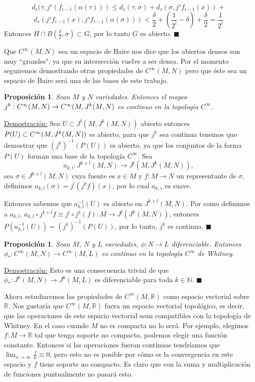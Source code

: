\documentclass{report}
\newtheorem{prop}[theorem]{Proposici\'on}
\theoremstyle{definition}
\begin{document}
$$ d_s (\tau , j^s (f_{i-1} (\alpha (\tau ))) \leq d_s( \tau , \sigma) + d_s (\sigma , j^s f_{i-1} (x)) +$$ $$ d_s (j^s f_{i-1} (x) , j^s f_{i-1} (\alpha (\sigma))) < \frac{\delta}{2} + \left( \frac{1}{2^{i}} - \delta \right) + \frac{\delta}{2} = \frac{1}{2^{i}}$$
Entonces  $H \cap B(\frac{\delta}{2} , \sigma ) \subset G$, por lo tanto $G$ es abierto. $\blacksquare$

Que $C^\infty (M,N)$ sea un espacio de Baire nos dice que los abiertos densos son muy ``grandes", ya que su intersecci\'on vuelve a ser densa. Por el momento seguiremos demostrando otras propiedades de $C^\infty (M,N)$ pero que \'este sea un espacio de Baire ser\'a una de las bases de este trabajo.

\begin{prop}
Sean $M$ y $N$ variedades. Entonces el mapeo $j^k : \\ C^\infty(M,N) \to C^\infty (M, J^k (M,N)$ es continuo en la topolog\'ia $C^\infty$.
\end{prop}
\underline{Demostraci\'on:} Sea $U \subset  J^l (M, J^k (M,N))$ abierto entonces $P(U) \subset \\ C^\infty (M , J^k (M, N))$ es abierto, para que $j^k$ sea continua tenemos que demostrar que $(j^k)^{-1} (P(U))$ es abierto, ya que los conjuntos de la forma $P(U)$ forman una base de la topolog\'ia $C^\infty$. Sea
$$a_{k,l}: J^{k+l} (M,N) \to J^l (M, J^k (M,N)),$$ sea $\sigma \in J^{k+l} (M,N)$ cuya fuente es $x\in M$ y $f:M \to N$ un representante de $\sigma$, definimos $a_{k,l} (\sigma) = j^l (j^k f) (x)$, por lo cual $a_{k,s}$ es suave.

Entonces sabemos que $a_{k,l}^{-1} (U)$ es abierto en $J^{k+l} (M,N)$. Por como definimos a $a_{k,l}$, $a_{k,l} \circ j^{k+l} f \equiv j^l \circ j^k (f) : M \to J^l (J^k (M,N))$, entonces $P (a_{k,l}^{-1} (U)) = (j^k)^{-1} (P(U))$, por lo tanto, $j^k$ es continua. $\blacksquare$

\begin{prop}
Sean $M$, $N$ y $L$ variedades, $\phi:N \to L$ diferenciable. Entonces $\phi_\ast: C^\infty (M,N) \to C^\infty (M, L)$ es continuo en la topolog\'ia $C^\infty$ de Whitney.

\end{prop}
\underline{Demostraci\'on:} Esto es una consecuencia trivial de que $\phi_\ast : J^k (M,N) \to J^k (M,L)$ es diferenciable para toda $k \in \mathbb{N}$. $\blacksquare$

Ahora estudiaremos las propiedades de $C^\infty (M, \mathbb{R}) $ como espacio vectorial sobre $\mathbb{R}$. Nos gustar\'ia que $C^\infty (M,\mathbb{R})$ fuera un espacio vectorial topol\'ogico, es decir, que las operaciones de este espacio vectorial sean compatibles con la topolog\'ia de Whitney. En el caso cuando $M$ no es compacta no lo ser\'a. Por ejemplo, elegimos $f:M \to \mathbb{R}$ tal que tenga soporte no compacto, podemos elegir una funci\'on constante. Entonces si las operaciones fueran continuas tendr\'iamos que $\lim_{n \to \infty} \frac{f}{n} \equiv 0$, pero esto no es posible por c\'omo es la convergencia en este espacio y $f$ tiene soporte no compacto. Es claro que con la suma y multiplicaci\'on de funciones puntualmente no pasar\'a esto.
\end{document}
